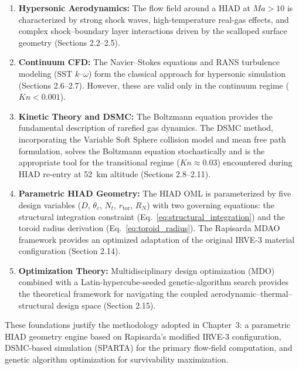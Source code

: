 \begin{enumerate}
    \item \textbf{Hypersonic Aerodynamics:} The flow field around a HIAD at $Ma > 10$ is characterized by strong shock waves, high-temperature real-gas effects, and complex shock--boundary layer interactions driven by the scalloped surface geometry (Sections 2.2--2.5).

    \item \textbf{Continuum CFD:} The Navier--Stokes equations and RANS turbulence modeling (SST $k$--$\omega$) form the classical approach for hypersonic simulation (Sections 2.6--2.7). However, these are valid only in the continuum regime ($Kn < 0.001$).

    \item \textbf{Kinetic Theory and DSMC:} The Boltzmann equation provides the fundamental description of rarefied gas dynamics. The DSMC method, incorporating the Variable Soft Sphere collision model and mean free path formulation, solves the Boltzmann equation stochastically and is the appropriate tool for the transitional regime ($Kn \approx 0.03$) encountered during HIAD re-entry at 52~km altitude (Sections 2.8--2.11).

    \item \textbf{Parametric HIAD Geometry:} The HIAD OML is parameterized by five design variables ($D$, $\theta_c$, $N_t$, $r_{\text{tor}}$, $R_N$) with two governing equations: the structural integration constraint (Eq.~\ref{eq:structural_integration}) and the toroid radius derivation (Eq.~\ref{eq:toroid_radius}). The Rapisarda MDAO framework provides an optimized adaptation of the original IRVE-3 material configuration (Section 2.14).

    \item \textbf{Optimization Theory:} Multidisciplinary design optimization (MDO) combined with a Latin-hypercube-seeded genetic-algorithm search provides the theoretical framework for navigating the coupled aerodynamic--thermal--structural design space (Section 2.15).
\end{enumerate}

\noindent These foundations justify the methodology adopted in Chapter~3: a parametric HIAD geometry engine based on Rapisarda's modified IRVE-3 configuration, DSMC-based simulation (SPARTA) for the primary flow-field computation, and genetic algorithm optimization for survivability maximization.
